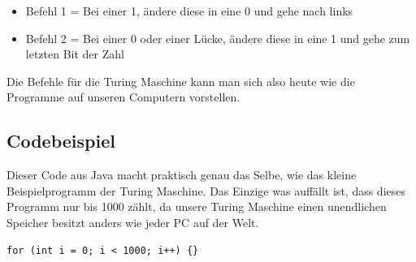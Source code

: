 \begin{itemize}
\item Befehl 1 = Bei einer 1, ändere diese in eine 0 und gehe nach links 
\item Befehl 2 = Bei einer 0 oder einer Lücke, ändere diese in eine 1 und gehe zum letzten Bit der Zahl 
\end{itemize}

Die Befehle für die Turing Maschine kann man sich also heute wie die Programme auf unseren Computern vorstellen.

\subsection{Codebeispiel}
Dieser Code aus Java macht praktisch genau das Selbe, wie das kleine Beispielprogramm der Turing Maschine. Das Einzige was auffällt ist, dass dieses Programm nur bis 1000 zählt, da unsere Turing Maschine einen unendlichen Speicher besitzt anders wie jeder PC auf der Welt.

\begin{verbatim}
for (int i = 0; i < 1000; i++) {}			
\end{verbatim}